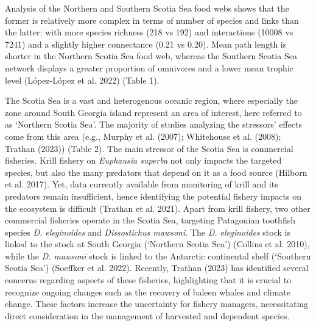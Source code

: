 \documentclass[
]{article}
\begin{document}
Analysis of the Northern and Southern Scotia Sea food webs shows that
the former is relatively more complex in terms of number of species and
links than the latter: with more species richness (218 vs 192) and
interactions (10008 vs 7241) and a slightly higher connectance (0.21 vs
0.20). Mean path length is shorter in the Northern Scotia Sea food web,
whereas the Southern Scotia Sea network displays a greater proportion of
omnivores and a lower mean trophic level (López-López et al. 2022)
(Table 1).

The Scotia Sea is a vast and heterogenous oceanic region, where
especially the zone around South Georgia island represent an area of
interest, here referred to as `Northern Scotia Sea'. The majority of
studies analyzing the stressors' effects come from this area (e.g.,
Murphy et al. (2007); Whitehouse et al. (2008); Trathan (2023)) (Table
2). The main stressor of the Scotia Sea is commercial fisheries. Krill
fishery on \emph{Euphausia superba} not only impacts the targeted
species, but also the many predators that depend on it as a food source
(Hilborn et al. 2017). Yet, data currently available from monitoring of
krill and its predators remain insufficient, hence identifying the
potential fishery impacts on the ecosystem is difficult (Trathan et al.
2021). Apart from krill fishery, two other commercial fisheries operate
in the Scotia Sea, targeting Patagonian toothfish species \emph{D.
eleginoides} and \emph{Dissostichus mawsoni}. The \emph{D. eleginoides}
stock is linked to the stock at South Georgia (`Northern Scotia Sea')
(Collins et al. 2010), while the \emph{D. mawsoni} stock is linked to
the Antarctic continental shelf (`Southern Scotia Sea') (Soeffker et al.
2022). Recently, Trathan (2023) has identified several concerns
regarding aspects of these fisheries, highlighting that it is crucial to
recognize ongoing changes such as the recovery of baleen whales and
climate change. These factors increase the uncertainty for fishery
managers, necessitating direct consideration in the management of
harvested and dependent species.
\end{document}
